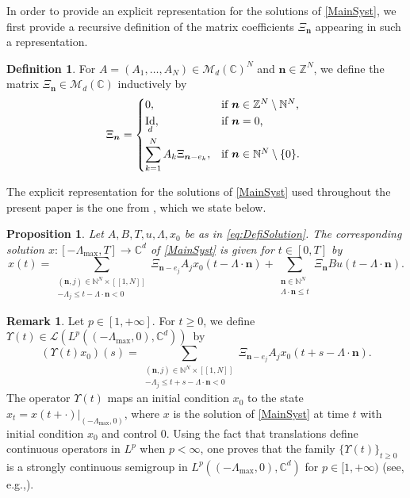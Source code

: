 \documentclass[10pt]{amsart}
\providecommand{\eg}{}
\renewcommand{\eg}{e.g.,\xspace}
\newcommand{\bn}{\boldsymbol{n}}
\newcommand{\llbracket}{[\![}
\newcommand{\rrbracket}{]\!]}
\theoremstyle{plain}
\newtheorem{prop}[theo]{Proposition}
\theoremstyle{definition}
\newtheorem{defi}[theo]{Definition}
\newtheorem{remk}[theo]{Remark}
\DeclareMathOperator{\id}{Id}
\begin{document}
In order to provide an explicit representation for the solutions of \eqref{MainSyst}, we first provide a recursive definition of the matrix coefficients $\Xi_{\bn}$ appearing in such a representation.

\begin{defi}
\label{ControlDelayDefiXi}
For $A = (A_1, \dots, A_N) \in \mathcal M_d(\mathbb C)^N$ and $\bn \in \mathbb Z^N$, we define the matrix $\Xi_{\bn} \in \mathcal M_d(\mathbb C)$ inductively by
\begin{equation}
\label{EqControlDelayDefiXi}
\Xi_{\bn} =
\begin{dcases*}
0, & if $\bn \in \mathbb Z^N \setminus \mathbb N^N$, \\
\id_d, & if $\bn = 0$, \\
\sum_{k=1}^N A_k \Xi_{\bn - e_k}, & if $\bn \in \mathbb N^N \setminus \{0\}$. \\
\end{dcases*}
\end{equation}
\end{defi}

The explicit representation for the solutions of \eqref{MainSyst} used throughout the present paper is the one from \cite[Prop.\,2.7]{Mazanti2017Relative}, which we state below.

\begin{prop}
\label{PropExplicit}
Let
$A,B,T,u,\Lambda,x_0$ be as in \eqref{eq:DefiSolution}.
The corresponding solution $x: \left[-\Lambda_{\max}, T\right] \to \mathbb C^d$ of \eqref{MainSyst} is given for $t \in [0, T]$ by
\begin{equation}%
x(t) = \sum_{\substack{(\bn, j) \in \mathbb N^N \times \llbracket 1, N\rrbracket \\ -\Lambda_j \leq t - \Lambda \cdot \bn < 0}} \Xi_{\bn - e_j} A_j x_0(t - \Lambda \cdot \bn) + \sum_{\substack{\bn \in \mathbb N^N \\ \Lambda \cdot \bn \leq t}} \Xi_{\bn} B u(t - \Lambda \cdot \bn).
\end{equation}
\end{prop}

\begin{remk}
\label{RemkSemigroup}
Let $p\!\in\![1, +\infty]$. For $t\!\geq\!0$, we define $\Upsilon(t)\!\in\!\mathcal L(L^p((-\Lambda_{\max}, 0), \mathbb C^d))$~by
\[
(\Upsilon(t)x_0)(s) = \sum_{\substack{(\bn, j) \in \mathbb N^N \times \llbracket 1, N\rrbracket \\ -\Lambda_j \leq t + s - \Lambda \cdot \bn < 0}} \Xi_{\bn - e_j} A_j x_0(t + s - \Lambda \cdot \bn).
\]
The operator $\Upsilon(t)$ maps an initial condition $x_0$ to the state $x_t = \left.x(t + \cdot)\right|_{(-\Lambda_{\max}, 0)}$, where $x$ is the solution of \eqref{MainSyst} at time $t$ with initial condition $x_0$ and control $0$. Using the fact that translations define continuous operators in $L^p$ when $p < \infty$, one proves that the family $\{\Upsilon(t)\}_{t \geq 0}$ is a strongly continuous semigroup in $L^p((-\Lambda_{\max}, 0), \mathbb C^d)$ for $p \in [1, +\infty)$ (see, \eg \cite[Prop.\,3.5]{Chitour2016Stability}).
\end{remk}
\end{document}
